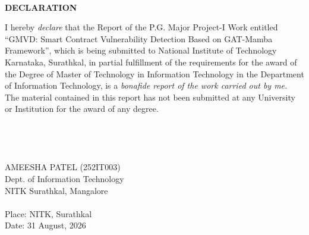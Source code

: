 \documentclass[12pt, a4paper, openright, twoside]{report}
\begin{document}
\clearpage
\newpage

\ %

\newpage
\thispagestyle{empty}

\begin{framed}
\begin{center}
\textbf{{\Large DECLARATION}}\\
\end{center}
\null
I hereby \textit{declare} that the Report of the P.G. Major Project-I Work entitled ``GMVD: Smart Contract Vulnerability Detection Based on GAT-Mamba Framework'', which is being submitted to National Institute of Technology Karnataka, Surathkal, in partial fulfillment of the requirements for the award of the Degree of Master of Technology in Information Technology in the Department of Information Technology, is a \textit{bonafide report of the work carried out by me.} The material contained in this report has not been submitted at any University or Institution for the award of any degree.\\
\\
\\
\\
\\
\null \hfill AMEESHA PATEL (252IT003)\\
\null \hfill Dept. of Information Technology\\
\null \hfill NITK Surathkal, Mangalore\\
\\
Place: NITK, Surathkal
\\
Date: 31 August, 2026
\end{framed}
\clearpage
\newpage

\ %

\newpage
\end{document}
